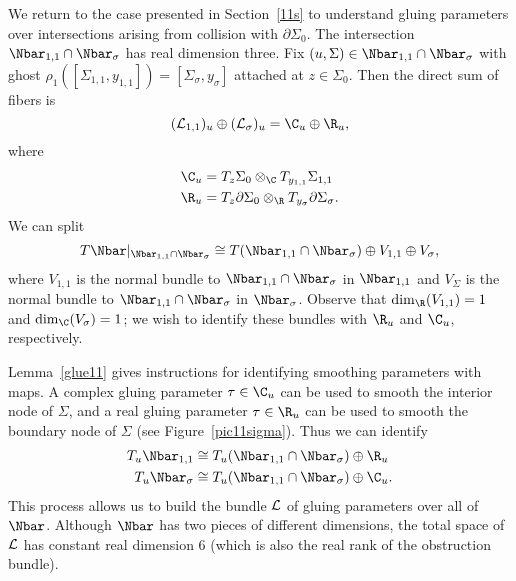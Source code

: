 \begin{example} \label{glueEx11}
We return to the case presented in Section~\ref{11s} to understand gluing parameters over intersections arising from collision with $\partial\Sigma_0$. The intersection $\Nbar_{1,1} \cap \Nbar_\sigma$ has real dimension three. Fix $(u,\Sigma) \in \Nbar_{1,1} \cap \Nbar_\sigma$ with ghost $\rho_{1}([\Sigma_{1,1},y_{1,1}])=[\Sigma_\sigma,y_\sigma]$ attached at $z \in \Sigma_0$. Then the direct sum of fibers is
\[
(\L_{1,1})_u \oplus (\L_{\sigma})_u = \C_u \oplus \R_u,
\]
where
\begin{align*}
\C_u & = T_z\Sigma_0 \otimes_\C T_{y_{1,1}}\Sigma_{1,1}
\\
\R_u & = T_z\partial\Sigma_0 \otimes_\R T_{y_\sigma}\partial\Sigma_\sigma.
\end{align*}
We can split
\[
T\Nbar|_{\Nbar_{1,1} \cap \Nbar_\sigma} \cong T(\Nbar_{1,1} \cap \Nbar_\sigma) \oplus V_{1,1} \oplus V_\sigma,
\]
where $V_{1,1}$ is the normal bundle to $\Nbar_{1,1} \cap \Nbar_\sigma$ in $\Nbar_{1,1}$ and $V_\Sigma$ is the normal bundle to $\Nbar_{1,1} \cap \Nbar_\sigma$ in $\Nbar_\sigma$. Observe that $\dim_\R(V_{1,1})=1$ and $\dim_\C(V_\sigma)=1$; we wish to identify these bundles with $\R_u$ and $\C_u$, respectively.

Lemma~\ref{glue11} gives instructions for identifying smoothing parameters with maps. A complex gluing parameter $\tau \in \C_u$ can be used to smooth the interior node of $\Sigma$, and a real gluing parameter $\tau \in \R_u$ can be used to smooth the boundary node of $\Sigma$ (see Figure~\ref{pic11sigma}). Thus we can identify 
\begin{align*}
T_u\Nbar_{1,1} & \cong T_u(\Nbar_{1,1} \cap \Nbar_\sigma) \oplus \R_u
\\
T_u\Nbar_\sigma & \cong T_u(\Nbar_{1,1} \cap \Nbar_\sigma) \oplus \C_u.
\end{align*}
This process allows us to build the bundle $\mathcal{L}$ of gluing parameters over all of $\Nbar$. Although $\Nbar$ has two pieces of different dimensions, the total space of $\mathcal{L}$ has constant real dimension $6$ (which is also the real rank of the obstruction bundle).
\end{example}


